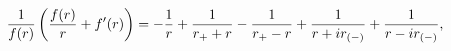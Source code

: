 \begin{equation}
{1 \over f(r)} \left ( {f(r) \over r} + f'(r) \right ) =
-{1 \over r} +{1\over {r_+ + r}} -{1\over {r_+ - r}}
+{1 \over {r+ i r_{(-)}}} +{1 \over {r- i r_{(-)}}} ,
\label{coef1_rprm}
\end{equation}

